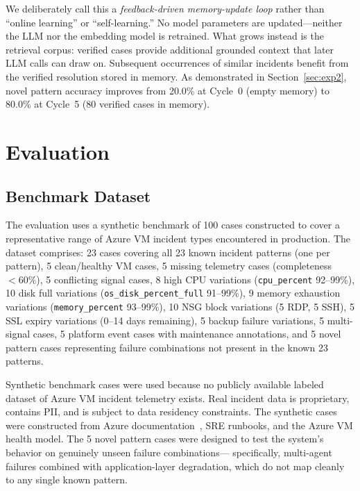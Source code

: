 \documentclass[a4paper,10pt,journal,compsoc]{IEEEtran}
\begin{document}
We deliberately call this a \emph{feedback-driven memory-update loop}
rather than ``online learning'' or ``self-learning.'' No model
parameters are updated---neither the LLM nor the embedding model is
retrained. What grows instead is the retrieval corpus: verified cases
provide additional grounded context that later LLM calls can draw on.
Subsequent occurrences of similar incidents benefit from the verified
resolution stored in memory. As
demonstrated in Section~\ref{sec:exp2}, novel pattern accuracy improves
from 20.0\% at Cycle~0 (empty memory) to 80.0\% at Cycle~5 (80
verified cases in memory).
\section{Evaluation}

\subsection{Benchmark Dataset}

The evaluation uses a synthetic benchmark of 100 cases constructed to
cover a representative range of Azure VM incident types encountered in
production. The dataset comprises: 23 cases covering all 23 known
incident patterns (one per pattern), 5 clean/healthy VM cases, 5
missing telemetry cases (completeness $< 60\%$), 5 conflicting signal
cases, 8 high CPU variations (\texttt{cpu\_percent} 92--99\%), 10 disk
full variations (\texttt{os\_disk\_percent\_full} 91--99\%), 9 memory
exhaustion variations (\texttt{memory\_percent} 93--99\%), 10 NSG block
variations (5 RDP, 5 SSH), 5 SSL expiry variations (0--14 days
remaining), 5 backup failure variations, 5 multi-signal cases, 5
platform event cases with maintenance annotations, and 5 novel pattern
cases representing failure combinations not present in the known 23
patterns.

Synthetic benchmark cases were used because no publicly available
labeled dataset of Azure VM incident telemetry exists. Real incident
data is proprietary, contains PII, and is subject to data residency
constraints. The synthetic cases were constructed from Azure
documentation~\cite{microsoft2024azuremonitor}, SRE runbooks, and the
Azure VM health model. The 5 novel pattern cases were designed to test
the system's behavior on genuinely unseen failure combinations---
specifically, multi-agent failures combined with application-layer
degradation, which do not map cleanly to any single known pattern.
\end{document}
